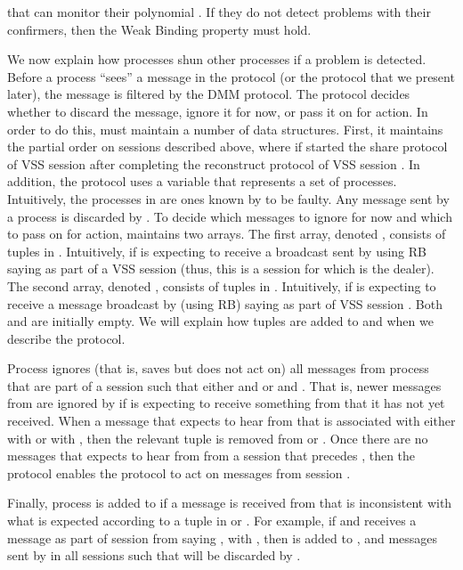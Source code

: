 \documentclass{sig-alternate}
\newcommand{\mwdavss}{\text{MW-SVSS}\xspace}
\newcommand{\davss}{{\text{SVSS}}\xspace}
\begin{document}
that can monitor their polynomial
.
If they do not detect
problems
with their confirmers,
then the
Weak Binding property must hold.


We now explain how processes shun other processes if a problem is detected.
Before a process  ``sees'' a message in the \mwdavss protocol (or the
\davss protocol that we present later),
the message is filtered by the DMM protocol.
The  protocol
decides whether to discard the message, ignore it for now, or pass it on
for action.
In order to do this,  must maintain a number of data
structures.
First, it maintains the partial order  on
sessions described above,
where  if  started the
share protocol of VSS session  after completing the
reconstruct protocol of VSS session .
In addition,
the  protocol uses a variable  that
represents a set of processes.
Intuitively, the processes in  are ones known by  to be faulty.
Any message sent by a process  is discarded by .
To decide which messages to ignore for now and which to pass on for
action,  maintains two arrays.
The first array, denoted , consists of tuples in
.
Intuitively,  if  is expecting to receive a
broadcast sent by  using RB saying  as part of a
VSS session  (thus, this is a session for which  is the dealer).
The second array, denoted , consists of tuples in
.  Intuitively,
 if  is expecting to receive a
message broadcast by  (using RB) saying 
as part of VSS session .
Both  and  are initially empty.
We will explain how tuples are added to  and  when
we describe the \mwdavss protocol.


Process  ignores
(that is, saves but does not act on)
all messages from process  that are part of a
session   such that either  and  or
 and .  That is,
newer
messages from  are ignored by  if  is
expecting to receive something from  that it has not yet received.
When a message that  expects to hear from  that is associated with
either with   or with , then the
relevant tuple is removed from  or
.
Once there are no messages that  expects to hear from 
from a session that precedes , then the  protocol enables
the \mwdavss protocol to act on messages from session .

Finally, process  is added to  if a message is received from 
that is inconsistent with what is expected according to a tuple in
 or .  For example, if
 and  receives a message as part of session
 from  saying , with , then  is
added to ,
and messages sent by  in all sessions  such that  will be
discarded by .
\end{document}
